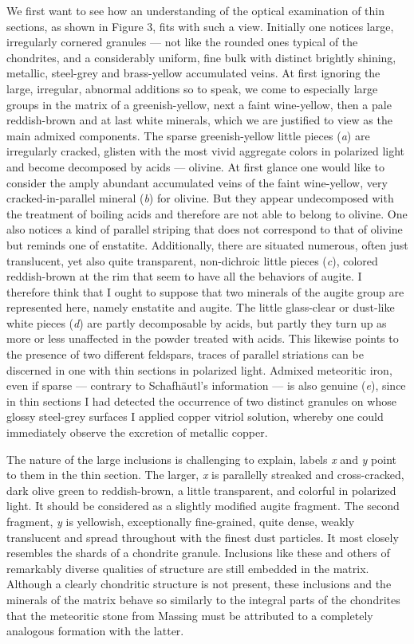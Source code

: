 \documentclass[a4paper, 12pt, oneside]{article}
\begin{document}
We first want to see how an understanding of the optical examination of thin sections, as shown in Figure 3, fits with such a view. Initially one notices large, irregularly cornered granules --- not like the rounded ones typical of the chondrites, and a considerably uniform, fine bulk with distinct brightly shining, metallic, steel-grey and brass-yellow accumulated veins. At first ignoring the large, irregular, abnormal additions so to speak, we come to especially large groups in the matrix of a greenish-yellow, next a faint wine-yellow, then a pale reddish-brown and at last white minerals, which we are justified to view as the main admixed components. The sparse greenish-yellow little pieces (\emph{a}) are irregularly cracked, glisten with the most vivid aggregate colors in polarized light and become decomposed by acids --- olivine. At first glance one would like to consider the amply abundant accumulated veins of the faint wine-yellow, very cracked-in-parallel mineral (\emph{b}) for olivine. But they appear undecomposed with the treatment of boiling acids and therefore are not able to belong to olivine. One also notices a kind of parallel striping that does not correspond to that of olivine but reminds one of enstatite. Additionally, there are situated numerous, often just translucent, yet also quite transparent, non-dichroic little pieces (\emph{c}), colored reddish-brown at the rim that seem to have all the behaviors of augite. I therefore think that I ought to suppose that two minerals of the augite group are represented here, namely enstatite and augite. The little glass-clear or dust-like white pieces (\emph{d}) are partly decomposable by acids, but partly they turn up as more or less unaffected in the powder treated with acids. This likewise points to the presence of two different feldspars, traces of parallel striations can be discerned in one with thin sections in polarized light. Admixed meteoritic iron, even if sparse --- contrary to Schafhäutl's information --- is also genuine (\emph{e}), since in thin sections I had detected the occurrence of two distinct granules on whose glossy steel-grey surfaces I applied copper vitriol solution, whereby one could immediately observe the excretion of metallic copper.

The nature of the large inclusions is challenging to explain, labels \emph{x} and \emph{y} point to them in the thin section. The larger, \emph{x} is parallelly streaked and cross-cracked, dark olive green to reddish-brown, a little transparent, and colorful in polarized light. It should be considered as a slightly modified augite fragment. The second fragment, \emph{y} is yellowish, exceptionally fine-grained, quite dense, weakly translucent and spread throughout with the finest dust particles. It most closely resembles the shards of a chondrite granule. Inclusions like these and others of remarkably diverse qualities of structure are still embedded in the matrix. Although a clearly chondritic structure is not present, these inclusions and the minerals of the matrix behave so similarly to the integral parts of the chondrites that the meteoritic stone from Massing must be attributed to a completely analogous formation with the latter.
\end{document}
